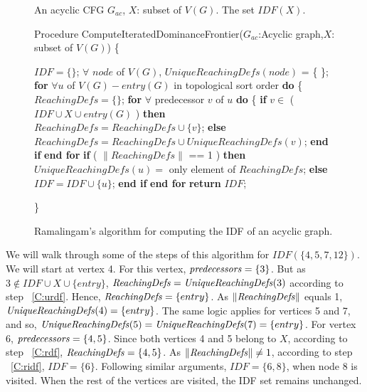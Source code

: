    \begin{figure}[!ht]
   \centering
  \begin{minipage}[t]{5in}
   An acyclic CFG $G_{ac}$, $X$: subset of $V(G)$.
   The set $IDF(X)$.
  \setcounter{linectr}{0}

    Procedure ComputeIteratedDominanceFrontier($G_{ac}$:Acyclic graph,$X$: subset of $V(G)$)
    \{
    \begin{code}

     $IDF = \{\}$; 
     $\forall$ $node$ of $V(G)$, $UniqueReachingDefs(node)$ = \{ \};
     {\bf for} $\forall u$ of $V(G) - entry(G)$ in topological sort order {\bf do} \{ 
        $ReachingDefs = \{ \}$; 
        {\bf for} $\forall$ predecessor $v$ of $u$ {\bf do} \{ 
          {\bf if} $v \in$ ( $IDF \cup X \cup entry(G)$ ) {\bf then} 
             $ReachingDefs = ReachingDefs \cup \{v\}$; \label{C:rdf}
          {\bf else} 
             $ReachingDefs = ReachingDefs \cup UniqueReachingDefs(v)$; \label{C:urdf}
          {\bf end if} 
       {\bf end for} 
       {\bf if} ( $\|ReachingDefs\|$ == 1 ) {\bf then} \label{C:onerd}
          $UniqueReachingDefs(u) = $ only element of $ReachingDefs$; 
       {\bf else} 
           $IDF = IDF \cup \{u\}$; \label{C:ridf}
       {\bf end if}    
     {\bf end for} 
     {\bf return} $IDF$;   
     
    \end{code}
    \}
 
  \end{minipage}
  \caption{Ramalingam's algorithm for computing the IDF of an acyclic graph.}
  \label{F:ramaIDF}
  \end{figure}

    We will walk through some of the steps of this algorithm for $IDF(\{4,5,7,12\})$. We will start at
    vertex 4. For this vertex, ${\it predecessors} = \{3\}$. But as $3 \notin IDF \cup X \cup \{entry\}$, 
    ${\it ReachingDefs} = {\it UniqueReachingDefs}(3)$ according to step ~\ref{C:urdf}. Hence, 
    ${\it ReachingDefs} = \{entry\}$. As $\|{\it ReachingDefs}\|$ equals 1, 
    ${\it UniqueReachingDefs}(4) = \{entry\}$.
    The same logic applies for vertices 5 and 7, and so, 
    ${\it UniqueReachingDefs}(5) = {\it UniqueReachingDefs}(7) = \{entry\}$.
    For vertex 6, ${\it predecessors} = \{4,5\}$.
    Since both vertices 4 and 5 belong to $X$, according to step ~\ref{C:rdf}, 
    ${\it ReachingDefs} = \{4,5\}$.
    As $\|{\it ReachingDefs}\| \neq 1$, according to step ~\ref{C:ridf}, $IDF = \{6\}$.
    Following similar arguments, $IDF = \{6,8\}$, when node 8 is visited. When the rest of the vertices
    are visited, the IDF set remains unchanged. 

